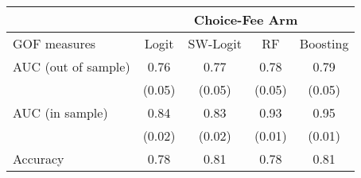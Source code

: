 \begin{tabular}{lcccc}
\toprule
      & \multicolumn{4}{c}{Choice-Fee Arm} \\
\midrule
\midrule
GOF measures & Logit & SW-Logit & RF    & Boosting \\
\midrule
\midrule
AUC (out of sample) & 0.76  & 0.77  & 0.78  & 0.79 \\
      & (0.05) & (0.05) & (0.05) & (0.05) \\
AUC (in sample) & 0.84  & 0.83  & 0.93  & 0.95 \\
      & (0.02) & (0.02) & (0.01) & (0.01) \\
Accuracy & 0.78  & 0.81  & 0.78  & 0.81 \\
\bottomrule
\bottomrule
\end{tabular}%
